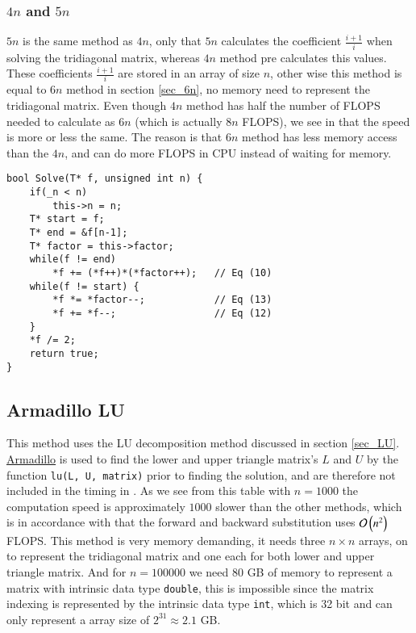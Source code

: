\documentclass[11pt,english,a4paper]{article}
\begin{document}
\begin{flushleft}
\subsubsection{$4n$ and $5n$}

$5n$ is the same method as $4n$, only that $5n$ calculates the coefficient $\frac{i+1}{i}$ when solving the tridiagonal matrix, whereas $4n$ method pre calculates this values. These coefficients $\frac{i+1}{i}$ are stored in an array of size $n$, other wise this method is equal to $6n$ method in section \ref{sec_6n}, no memory need to represent the tridiagonal matrix. Even though $4n$ method has half the number of FLOPS needed to calculate as $6n$ (which is actually $8n$ FLOPS), we see in  that the speed is more or less the same. The reason is that $6n$ method has less memory access than the $4n$, and can do more FLOPS in CPU instead of waiting for memory.

\begin{lstlisting}[frame=single, caption={\texttt{Matrix<MatrixType::Tridiagonal\_minus1\_2\_minus1\_4n, T>::Solve}}]  
bool Solve(T* f, unsigned int n) {
	if(_n < n)
		this->n = n;
	T* start = f;
	T* end = &f[n-1];
	T* factor = this->factor;
	while(f != end)
		*f += (*f++)*(*factor++);   // Eq (10)
	while(f != start) {
		*f *= *factor--;            // Eq (13)
		*f += *f--;                 // Eq (12)
	}
	*f /= 2;
	return true;
}
\end{lstlisting}

\subsection{Armadillo LU}

This method uses the LU decomposition method discussed in section \ref{sec_LU}. \href{http://arma.sourceforge.net/}{Armadillo} is used to find the lower and upper triangle matrix's $L$ and $U$ by the function \texttt{lu(L, U, matrix)} prior to finding the solution, and are therefore not included in the timing in . As we see from this table with $n = 1000$ the computation speed is approximately $1000$ slower than the other methods, which is in accordance with that the forward and backward substitution uses $\mathcal{O}\left({n^2}\right)$ FLOPS. This method is very memory demanding, it needs three $n\times n$ arrays, on to represent the tridiagonal matrix and one each for both lower and upper triangle matrix. And for $n=100000$ we need 80 GB of memory to represent a matrix with intrinsic data type \texttt{double}, this is impossible since the matrix indexing is represented by the intrinsic data type \texttt{int}, which is 32 bit and can only represent a array size of $2^{31} \approx 2.1$ GB.


\end{flushleft}
\end{document}
